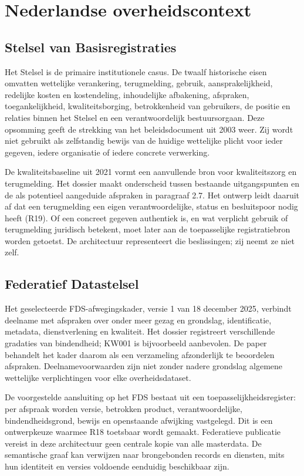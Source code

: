 \section{Nederlandse overheidscontext}
\subsection{Stelsel van Basisregistraties}
Het Stelsel is de primaire institutionele casus. De twaalf historische eisen omvatten wettelijke verankering, terugmelding, gebruik, aansprakelijkheid, redelijke kosten en kostendeling, inhoudelijke afbakening, afspraken, toegankelijkheid, kwaliteitsborging, betrokkenheid van gebruikers, de positie en relaties binnen het Stelsel en een verantwoordelijk bestuursorgaan. \citep{S25} Deze opsomming geeft de strekking van het beleidsdocument uit 2003 weer. Zij wordt niet gebruikt als zelfstandig bewijs van de huidige wettelijke plicht voor ieder gegeven, iedere organisatie of iedere concrete verwerking.

De kwaliteitsbaseline uit 2021 vormt een aanvullende bron voor kwaliteitszorg en terugmelding. Het dossier maakt onderscheid tussen bestaande uitgangspunten en de als potentieel aangeduide afspraken in paragraaf 2.7. \citep{S26} Het ontwerp leidt daaruit af dat een terugmelding een eigen verantwoordelijke, status en besluitspoor nodig heeft (R19). Of een concreet gegeven authentiek is, en wat verplicht gebruik of terugmelding juridisch betekent, moet later aan de toepasselijke registratiebron worden getoetst. De architectuur representeert die beslissingen; zij neemt ze niet zelf.

\subsection{Federatief Datastelsel}
Het geselecteerde FDS-afwegingskader, versie 1 van 18 december 2025, verbindt deelname met afspraken over onder meer gezag en grondslag, identificatie, metadata, dienstverlening en kwaliteit. Het dossier registreert verschillende gradaties van bindendheid; KW001 is bijvoorbeeld aanbevolen. \citep{S27} De paper behandelt het kader daarom als een verzameling afzonderlijk te beoordelen afspraken. Deelnamevoorwaarden zijn niet zonder nadere grondslag algemene wettelijke verplichtingen voor elke overheidsdataset.

De voorgestelde aansluiting op het FDS bestaat uit een toepasselijkheidsregister: per afspraak worden versie, betrokken product, verantwoordelijke, bindendheidsgrond, bewijs en openstaande afwijking vastgelegd. Dit is een ontwerpkeuze waarmee R18 toetsbaar wordt gemaakt. Federatieve publicatie vereist in deze architectuur geen centrale kopie van alle masterdata. De semantische graaf kan verwijzen naar brongebonden records en diensten, mits hun identiteit en versies voldoende eenduidig beschikbaar zijn.

